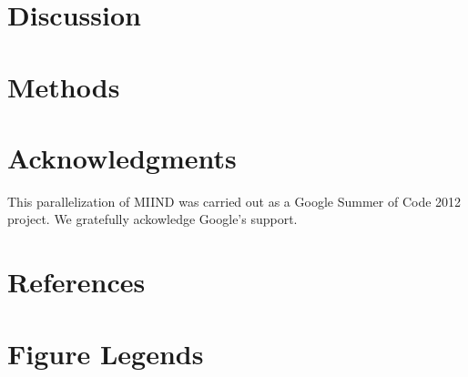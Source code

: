 \documentclass[12pt]{article}
\begin{document}
\section{Discussion}

\section*{Methods}
\label{sec-methods}
\section*{Acknowledgments}
This parallelization of MIIND was carried out as a Google Summer of Code 2012 project. We gratefully ackowledge Google's support. 
\section*{References}



\section*{Figure Legends}
\end{document}

